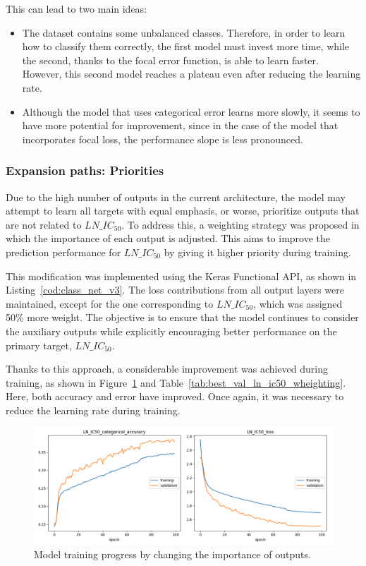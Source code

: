 This can lead to two main ideas:

\begin{itemize}
    \item The dataset contains some unbalanced classes. Therefore, in order to learn how to classify them correctly, the first model must invest more time, while the second, thanks to the focal error function, is able to learn faster. However, this second model reaches a plateau even after reducing the learning rate.
    \item Although the model that uses categorical error learns more slowly, it seems to have more potential for improvement, since in the case of the model that incorporates focal loss, the performance slope is less pronounced.
\end{itemize}

\subsubsection{Expansion paths: Priorities}

Due to the high number of outputs in the current architecture, the model may attempt to learn all targets with equal emphasis, or worse, prioritize outputs that are not related to \(LN\_IC_{50}\). To address this, a weighting strategy was proposed in which the importance of each output is adjusted. This aims to improve the prediction performance for \(LN\_IC_{50}\) by giving it higher priority during training.

This modification was implemented using the Keras Functional API, as shown in Listing~\ref{cod:class_net_v3}. The loss contributions from all output layers were maintained, except for the one corresponding to \(LN\_IC_{50}\), which was assigned 50\% more weight. The objective is to ensure that the model continues to consider the auxiliary outputs while explicitly encouraging better performance on the primary target, \(LN\_IC_{50}\).

Thanks to this approach, a considerable improvement was achieved during training, as shown in Figure~\ref{fig:train_class_net_v3} and Table~\ref{tab:best_val_ln_ic50_wheighting}. Here, both accuracy and error have improved. Once again, it was necessary to reduce the learning rate during training.

\begin{figure}[H]
    \centering
    \includegraphics[width=1\textwidth]{figures/neural_net_classification/classification_mse_v3.png}
    \caption{Model training progress by changing the importance of outputs.}
    \label{fig:train_class_net_v3}
\end{figure}


